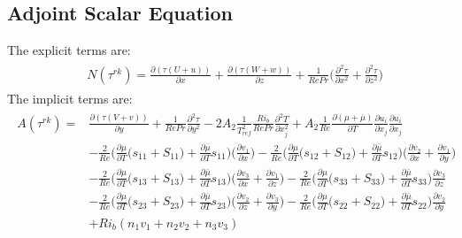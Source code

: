 \documentclass[preprint,12pt]{article}
\begin{document}
\subsection{Adjoint Scalar Equation}
The explicit terms are:
\begin{align}\begin{split}
&N(\tau^{rk})=\frac{\partial(\tau(U+u))}{\partial x}+\frac{\partial(\tau(W+w))}{\partial z}+\frac{1}{RePr}\Bigg(\frac{\partial^2\tau}{\partial x^2}+\frac{\partial^2\tau}{\partial z^2}\Bigg)
\end{split} \end{align}
The implicit terms are:
\begin{align}\begin{split}
A(\tau^{rk})=&\frac{\partial(\tau(V+v))}{\partial y}+\frac{1}{RePr}\frac{\partial^2\tau}{\partial y^2}-2A_2\frac{1}{T_{ref}^2}\frac{Ri_b}{Re Pr}\frac{\partial^2 T}{\partial x_j^2}+A_2\frac{1}{Re}\frac{\partial (\mu+\overline{\mu})}{\partial T}\frac{\partial u_{i}}{\partial x_j}\frac{\partial u_{i}}{\partial x_j}\\&-\frac{2}{Re}\Big(\frac{\partial\mu}{\partial T}\big(s_{11}+S_{11}\big)+\frac{\partial\bar{\mu}}{\partial T}s_{11}\Big)\Bigg(\frac{\partial v_1}{\partial x}\Bigg)-\frac{2}{Re}\Big(\frac{\partial\mu}{\partial T}\big(s_{12}+S_{12}\big)+\frac{\partial\bar{\mu}}{\partial T}s_{12}\Big)\Bigg(\frac{\partial v_2}{\partial x}+\frac{\partial v_1}{\partial y}\Bigg)\\&-\frac{2}{Re}\Big(\frac{\partial\mu}{\partial T}\big(s_{13}+S_{13}\big)+\frac{\partial\bar{\mu}}{\partial T}s_{13}\Big)\Bigg(\frac{\partial v_3}{\partial x}+\frac{\partial v_1}{\partial z}\Bigg)-\frac{2}{Re}\Big(\frac{\partial\mu}{\partial T}\big(s_{33}+S_{33}\big)+\frac{\partial\bar{\mu}}{\partial T}s_{33}\Big)\frac{\partial v_3}{\partial z}\\&-\frac{2}{Re}\Big(\frac{\partial\mu}{\partial T}\big(s_{23}+S_{23}\big)+\frac{\partial\bar{\mu}}{\partial T}s_{23}\Big)\Bigg(\frac{\partial v_2}{\partial z}+\frac{\partial v_3}{\partial y}\Bigg)-\frac{2}{Re}\Big(\frac{\partial\mu}{\partial T}\big(s_{22}+S_{22}\big)+\frac{\partial\bar{\mu}}{\partial T}s_{22}\Big)\frac{\partial v_2}{\partial y}\\&+Ri_b(n_1v_1+n_2v_2+n_3v_3)
\end{split}
\end{align}
\end{document}
